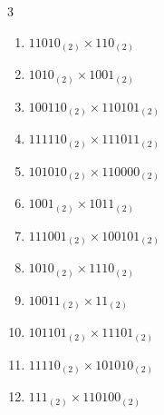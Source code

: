 \begin{multicols}{3}
\begin{enumerate}
  \item $11010_{(2)} \times 110_{(2)}$


\columnbreak %

  \item $1010_{(2)} \times 1001_{(2)}$


  \item $100110_{(2)} \times 110101_{(2)}$


  \item $111110_{(2)} \times 111011_{(2)}$


  \item $101010_{(2)} \times 110000_{(2)}$


  \item $1001_{(2)} \times 1011_{(2)}$


\columnbreak %

\resetques

  \item $111001_{(2)} \times 100101_{(2)}$


  \item $1010_{(2)} \times 1110_{(2)}$


  \item $10011_{(2)} \times 11_{(2)}$


  \item $101101_{(2)} \times 11101_{(2)}$


  \item $11110_{(2)} \times 101010_{(2)}$


\columnbreak %

  \item $111_{(2)} \times 110100_{(2)}$



\end{enumerate}
\end{multicols}
